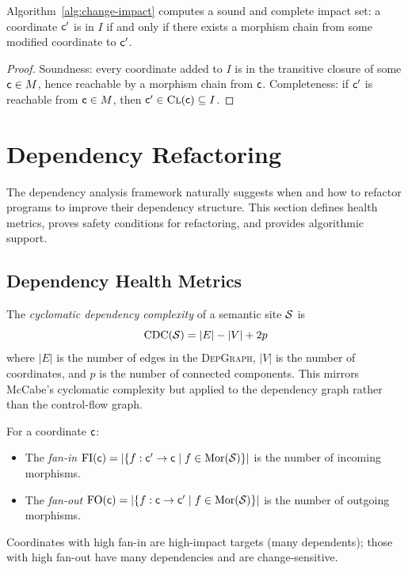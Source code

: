 \documentclass[11pt]{article}
\newcommand{\DepGraph}{\textsc{DepGraph}}
\begin{document}
\begin{proposition}\label{prop:prop-complete}
Algorithm~\ref{alg:change-impact} computes a sound and complete impact set:
a coordinate $\mathsf{c}'$ is in $I$ if and only if there exists a morphism
chain from some modified coordinate to $\mathsf{c}'$.
\end{proposition}

\begin{proof}
Soundness: every coordinate added to $I$ is in the transitive closure of
some $\mathsf{c} \in M$, hence reachable by a morphism chain from $\mathsf{c}$.
Completeness: if $\mathsf{c}'$ is reachable from $\mathsf{c} \in M$, then
$\mathsf{c}' \in \textsc{Cl}(\mathsf{c}) \subseteq I$.
\end{proof}

\section{Dependency Refactoring}\label{sec:refactoring}

The dependency analysis framework naturally suggests when and how to
refactor programs to improve their dependency structure.  This section
defines health metrics, proves safety conditions for refactoring, and
provides algorithmic support.

\subsection{Dependency Health Metrics}\label{sec:dep-health}

\begin{definition}\label{def:cyclomatic-dep}
The \emph{cyclomatic dependency complexity} of a semantic site $\mathcal{S}$ is
\[
  \mathrm{CDC}(\mathcal{S}) = |E| - |V| + 2p
\]
where $|E|$ is the number of edges in the \DepGraph, $|V|$ is the number
of coordinates, and $p$ is the number of connected components.  This
mirrors McCabe's cyclomatic complexity but applied to the dependency graph
rather than the control-flow graph.
\end{definition}

\begin{definition}\label{def:fan-in-out}
For a coordinate $\mathsf{c}$:
\begin{itemize}[noitemsep]
  \item The \emph{fan-in} $\mathrm{FI}(\mathsf{c}) = |\{f : \mathsf{c}' \to \mathsf{c}
        \mid f \in \mathrm{Mor}(\mathcal{S})\}|$ is the number of incoming morphisms.
  \item The \emph{fan-out} $\mathrm{FO}(\mathsf{c}) = |\{f : \mathsf{c} \to \mathsf{c}'
        \mid f \in \mathrm{Mor}(\mathcal{S})\}|$ is the number of outgoing morphisms.
\end{itemize}
Coordinates with high fan-in are high-impact targets (many dependents);
those with high fan-out have many dependencies and are change-sensitive.
\end{definition}
\end{document}
